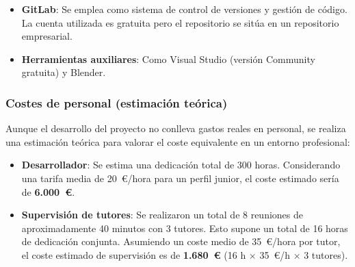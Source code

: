\begin{itemize}
\begin{itemize}
  \item \textbf{GitLab}: Se emplea como sistema de control de versiones y gestión de código. La cuenta utilizada es gratuita pero el repositorio se sitúa en un repositorio empresarial.

  \item \textbf{Herramientas auxiliares}: Como Visual Studio (versión Community gratuita) y Blender.
\end{itemize}

\subsubsection*{Costes de personal (estimación teórica)}
Aunque el desarrollo del proyecto no conlleva gastos reales en personal, se realiza una estimación teórica para valorar el coste equivalente en un entorno profesional:

\begin{itemize}
  \item \textbf{Desarrollador}: Se estima una dedicación total de 300 horas. Considerando una tarifa media de 20~€/hora para un perfil junior, el coste estimado sería de \textbf{6.000~€}.

  \item \textbf{Supervisión de tutores}: Se realizaron un total de 8 reuniones de aproximadamente 40 minutos con 3 tutores. Esto supone un total de 16 horas de dedicación conjunta. Asumiendo un coste medio de 35~€/hora por tutor, el coste estimado de supervisión es de \textbf{1.680~€} (16 h × 35~€/h × 3 tutores).
\end{itemize}



\end{itemize}

